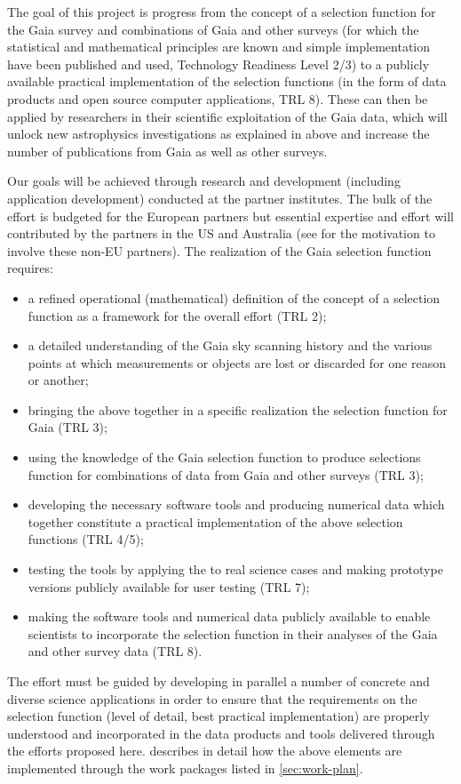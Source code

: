 The goal of this project is progress from the concept of a selection function for the Gaia survey  and combinations of Gaia and other surveys (for which the statistical and mathematical principles are known and simple implementation have been published and used, Technology Readiness Level 2/3) to a publicly available practical implementation of the selection functions (in the form of data products and open source computer applications, TRL 8). These can then be applied by researchers in their scientific exploitation of the Gaia data, which will unlock new astrophysics investigations as explained in  above and increase the number of publications from Gaia as well as other surveys. 

Our goals will be achieved through research and development (including application development) conducted at the {\acro} partner institutes. The bulk of the effort is budgeted for the European partners but essential expertise and effort will contributed by the partners in the US and Australia (see  for the motivation to involve these non-EU partners). The realization of the Gaia selection function requires: 
\begin{itemize}
    \item a refined operational (mathematical) definition of the concept of a selection function as a framework for the overall effort (TRL 2);
    \item a detailed understanding of the Gaia sky scanning history and the various points at which measurements or objects are lost or discarded for one reason or another;
    \item bringing the above together in a specific realization the selection function for Gaia (TRL 3);
    \item using the knowledge of the Gaia selection function to produce selections function for combinations of data from Gaia and other surveys (TRL 3);
    \item developing the necessary software tools and producing numerical data which together constitute a practical implementation of the above selection functions (TRL 4/5);
    \item testing the tools by applying the to real science cases and making prototype versions publicly available for user testing (TRL 7);
    \item making the software tools and numerical data publicly available to enable scientists to incorporate the selection function in their analyses of the Gaia and other survey data (TRL 8).
\end{itemize}
The {\acro} effort must be guided by developing in parallel a number of concrete and diverse science applications in order to ensure that the requirements on the selection function (level of detail, best practical implementation) are properly understood and incorporated in the data products and tools delivered through the efforts proposed here.  describes in detail how the above elements are implemented through the work packages listed in \ref{sec:work-plan}.

